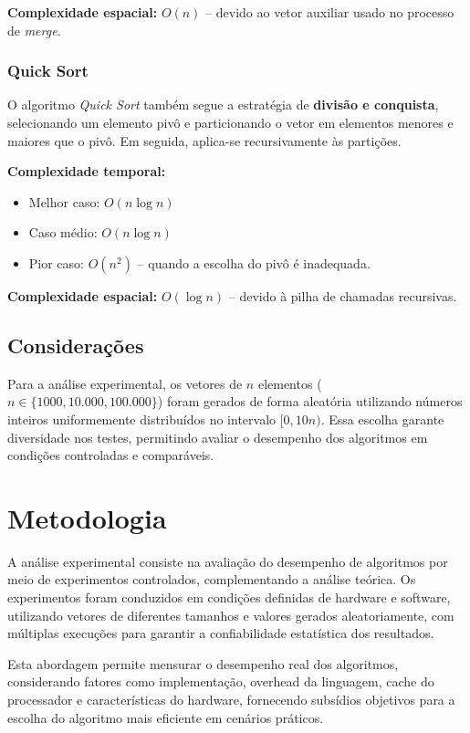 \documentclass[12pt]{article}
\begin{document}
\textbf{Complexidade espacial:} $O(n)$ -- devido ao vetor auxiliar usado no processo de \textit{merge}.

\subsubsection{Quick Sort}

O algoritmo \textit{Quick Sort} também segue a estratégia de \textbf{divisão e conquista}, selecionando um elemento pivô e particionando o vetor em elementos menores e maiores que o pivô. Em seguida, aplica-se recursivamente às partições.

\textbf{Complexidade temporal:}
\begin{itemize}
    \item Melhor caso: $O(n \log n)$
    \item Caso médio: $O(n \log n)$
    \item Pior caso: $O(n^2)$ -- quando a escolha do pivô é inadequada.
\end{itemize}

\textbf{Complexidade espacial:} $O(\log n)$ -- devido à pilha de chamadas recursivas.

\subsection{Considerações}

Para a análise experimental, os vetores de $n$ elementos ($n \in \{1000, 10.000, 100.000\}$) foram gerados de forma aleatória utilizando números inteiros uniformemente distribuídos no intervalo $[0, 10n)$. Essa escolha garante diversidade nos testes, permitindo avaliar o desempenho dos algoritmos em condições controladas e comparáveis.

\section{Metodologia}

A análise experimental consiste na avaliação do desempenho de algoritmos por meio de experimentos controlados, complementando a análise teórica. Os experimentos foram conduzidos em condições definidas de hardware e software, utilizando vetores de diferentes tamanhos e valores gerados aleatoriamente, com múltiplas execuções para garantir a confiabilidade estatística dos resultados. 

Esta abordagem permite mensurar o desempenho real dos algoritmos, considerando fatores como implementação, overhead da linguagem, cache do processador e características do hardware, fornecendo subsídios objetivos para a escolha do algoritmo mais eficiente em cenários práticos.
\end{document}
